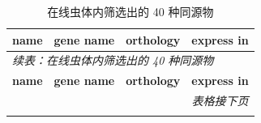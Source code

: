 \begin{longtable}{lllp{7cm}}
  \caption{在线虫体内筛选出的 40 种同源物} \\
  \toprule
  \textbf{name} & \textbf{gene name} & \textbf{orthology} & \textbf{express in} \\
  \midrule
  \endfirsthead

  \multicolumn{4}{l}{\textit{续表：在线虫体内筛选出的 40 种同源物}} \\
  \toprule
  \textbf{name} & \textbf{gene name} & \textbf{orthology} & \textbf{express in} \\
  \midrule
  \endhead

  \bottomrule
  \multicolumn{4}{r}{\textit{表格接下页}} \\
  \endfoot

  \bottomrule
  \endlastfoot


\end{longtable}
